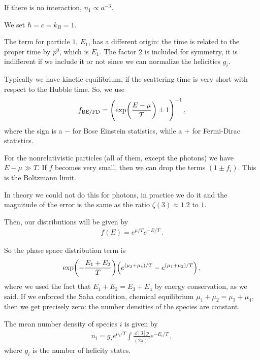 \documentclass[main.tex]{subfiles}
\begin{document}

If there is no interaction, \(n_1 \propto a^{-3}\). 

We set \(\hbar = c = k_B = 1\).


The term for particle \(1\), \(E_1\), has a different origin: the time is related to the proper time by \(p^{0}\), which is \(E_1\). The factor \(2\) is included for symmetry, it is indifferent if we include it or not since we can normalize the helicities \(g_{i}\). 

Typically we have kinetic equilibrium, if the scattering time is very short with respect to the Hubble time. 
So, we use 
%
\begin{align}
f_{\text{BE/FD}} = \qty(\exp(\frac{E- \mu }{T}) \pm 1)^{-1}
\,,
\end{align}
%
where the sign is a \(-\) for Bose Einstein statistics, while a \(+\) for Fermi-Dirac statistics. 

For the nonrelativistic particles (all of them, except the photons) we have \(E - \mu \gg T\). 
If \(f\) becomes very small, then we can drop the terms \((1 \pm f_i)\). This is the Boltzmann limit. 

In theory we could not do this for photons, in practice we do it and the magnitude of the error is the same as the ratio \(\zeta (3) \approx 1.2\) to \(1\). 

Then, our distributions will be given by 
%
\begin{align}
f(E) = e^{ \mu / T} e^{- E/ T}
\,.
\end{align}

So the phase space distribution term is 
%
\begin{align}
\exp(- \frac{E_1 + E_2 }{T} ) \qty(e^{(\mu_3 + \mu_4 ) / T} - e^{(\mu_1 + \mu_2 ) / T})
\,,
\end{align}
%
where we used the fact that \(E_1 + E_2 = E_3 + E_4 \) by energy conservation, as we said. 
If we enforced the Saha condition, chemical equilibrium \(\mu_1 + \mu_2 = \mu_3 + \mu_4 \), then we get precisely zero: the number densities of the species are constant.

The mean number density of species \(i\) is given by 
%
\begin{align}
n_i = g_i e^{\mu_{i} / T} \int \frac{ \dd[3]{p} }{(2 \pi )^3} e^{-E_i / T}
\,,
\end{align}
%
where \(g_i\) is the number of helicity states. 
\end{document}

